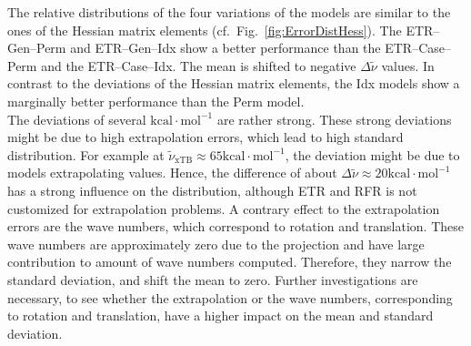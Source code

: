 The relative distributions of the four variations of the models are similar to the ones of the Hessian matrix elements (cf.~Fig.~\ref{fig:ErrorDistHess}).
The \mbox{ETR--Gen--Perm} and \mbox{ETR--Gen--Idx} show a better performance than the \mbox{ETR--Case--Perm} and the \mbox{ETR--Case--Idx}.
The mean is shifted to negative $\Delta \tilde{\nu}$ values.
In contrast to the deviations of the Hessian matrix elements, the Idx models show a marginally better performance than the Perm model.\\
\newpage
The deviations of several $\mathrm{kcal \cdot mol^{-1}}$ are rather strong.
These strong deviations might be due to high extrapolation errors, which lead to high standard distribution.
For example at $\tilde{\nu}_\mathrm{xTB} \approx 65 \mathrm{kcal \cdot mol^{-1}}$, the deviation might be due to models extrapolating values.
Hence, the difference of about $\Delta \tilde{\nu} \approx 20 \mathrm{kcal \cdot mol^{-1}}$  has a strong influence on the distribution,
although ETR and RFR is not customized for extrapolation problems.
A contrary effect to the extrapolation errors are the wave numbers, which correspond to rotation and translation.
These wave numbers are approximately zero due to the projection and have large contribution to amount of wave numbers computed.
Therefore, they narrow the standard deviation, and shift the mean to zero. Further investigations are necessary,
to see whether the extrapolation or the wave numbers, corresponding to rotation and translation, have a higher impact on the mean and standard deviation.\\
\newpage
